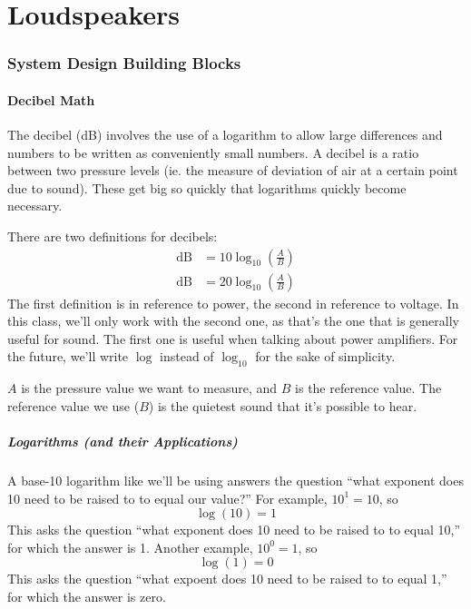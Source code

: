 \documentclass[a4paper]{article}
\begin{document}
\maketitle

\tableofcontents
\clearpage

\part{Loudspeakers}

\section{System Design Building Blocks}
\subsection{Decibel Math}
The decibel (dB) involves the use of a logarithm to allow large differences and
numbers to be written as conveniently small numbers. A decibel is a ratio
between two pressure levels (ie. the measure of deviation of air at a certain
point due to sound). These get big so quickly that logarithms quickly become
necessary.

There are two definitions for decibels:
\begin{align*}
	\mathrm{dB} &= 10\log_{10}\left(\frac{A}{B}\right)\\
	\mathrm{dB} &= 20\log_{10}\left(\frac{A}{B}\right)
\end{align*}
The first definition is in reference to power, the second in reference to
voltage. In this class, we'll only work with the second one, as that's the one
that is generally useful for sound. The first one is useful when talking about
power amplifiers. For the future, we'll write $\log$ instead of $\log_{10}$ for
the sake of simplicity.

$A$ is the pressure value we want to measure, and $B$ is the reference value.
The reference value we use ($B$) is the quietest sound that it's possible to
hear.

\subsubsection{Logarithms (and their Applications)}
A base-10 logarithm like we'll be using answers the question ``what exponent
does 10 need to be raised to to equal our value?''
For example, $10^1 = 10$, so
\[
	\log(10) = 1
\]
This asks the question ``what exponent does 10 need to be raised to to equal
10,'' for which the answer is 1.
Another example, $10^0 = 1$, so
\[
	\log(1) = 0
\]
This asks the question ``what expoent does 10 need to be raised to to equal
1,'' for which the answer is zero.
\end{document}
